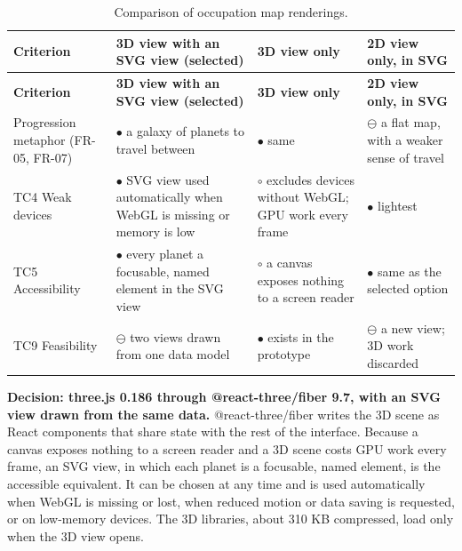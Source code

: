 {\small
\begin{longtable}{|>{\raggedright\arraybackslash}p{}|>{\raggedright\arraybackslash}p{}|>{\raggedright\arraybackslash}p{}|>{\raggedright\arraybackslash}p{}|}
\caption{Comparison of occupation map renderings.} \\
\hline
\textbf{Criterion} & \textbf{3D view with an SVG view (selected)} & \textbf{3D view only} & \textbf{2D view only, in SVG} \\ \hline
\endfirsthead
\hline
\textbf{Criterion} & \textbf{3D view with an SVG view (selected)} & \textbf{3D view only} & \textbf{2D view only, in SVG} \\ \hline
\endhead
Progression metaphor (FR-05, FR-07) & $\bullet$ a galaxy of planets to travel between & $\bullet$ same & $\ominus$ a flat map, with a weaker sense of travel \\ \hline
TC4 Weak devices & $\bullet$ SVG view used automatically when WebGL is missing or memory is low & $\circ$ excludes devices without WebGL; GPU work every frame\cite{r139} & $\bullet$ lightest \\ \hline
TC5 Accessibility & $\bullet$ every planet a focusable, named element in the SVG view\cite{r140} & $\circ$ a canvas exposes nothing to a screen reader & $\bullet$ same as the selected option \\ \hline
TC9 Feasibility & $\ominus$ two views drawn from one data model & $\bullet$ exists in the prototype & $\ominus$ a new view; 3D work discarded \\ \hline
\end{longtable}
}

\textbf{Decision: three.js 0.186 through @react-three/fiber 9.7, with an SVG view drawn from the same data.} @react-three/fiber writes the 3D scene as React components that share state with the rest of the interface\cite{r138}. Because a canvas exposes nothing to a screen reader and a 3D scene costs GPU work every frame\cite{r139}, an SVG view, in which each planet is a focusable, named element\cite{r140}, is the accessible equivalent. It can be chosen at any time and is used automatically when WebGL is missing or lost, when reduced motion or data saving is requested, or on low-memory devices. The 3D libraries, about 310 KB compressed, load only when the 3D view opens.

